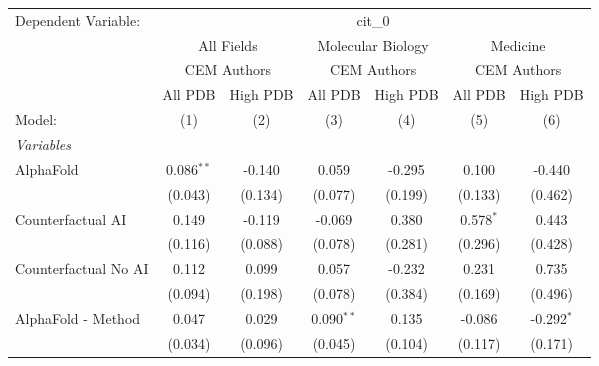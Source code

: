 \begingroup
\centering
\begin{tabular}{lcccccc}
   \tabularnewline \midrule \midrule
   Dependent Variable: & \multicolumn{6}{c}{cit\_0}\\
 & \multicolumn{2}{c}{All Fields} & \multicolumn{2}{c}{Molecular Biology} & \multicolumn{2}{c}{Medicine} \\
\cmidrule(lr){2-3} \cmidrule(lr){4-5} \cmidrule(lr){6-7}
 & \multicolumn{2}{c}{CEM Authors} & \multicolumn{2}{c}{CEM Authors} & \multicolumn{2}{c}{CEM Authors} \\
\cmidrule(lr){2-3} \cmidrule(lr){4-5} \cmidrule(lr){6-7}
 & \multicolumn{1}{c}{All PDB} & \multicolumn{1}{c}{High PDB} & \multicolumn{1}{c}{All PDB} & \multicolumn{1}{c}{High PDB} & \multicolumn{1}{c}{All PDB} & \multicolumn{1}{c}{High PDB} \\
\cmidrule(lr){2-2} \cmidrule(lr){3-3} \cmidrule(lr){4-4} \cmidrule(lr){5-5} \cmidrule(lr){6-6} \cmidrule(lr){7-7}
   Model:                                                     & (1)           & (2)            & (3)          & (4)     & (5)           & (6)\\  
   \midrule
   \emph{Variables}\\
   AlphaFold                                                  & 0.086$^{**}$  & -0.140         & 0.059        & -0.295  & 0.100         & -0.440\\   
                                                              & (0.043)       & (0.134)        & (0.077)      & (0.199) & (0.133)       & (0.462)\\   
   Counterfactual AI                                          & 0.149         & -0.119         & -0.069       & 0.380   & 0.578$^{*}$   & 0.443\\   
                                                              & (0.116)       & (0.088)        & (0.078)      & (0.281) & (0.296)       & (0.428)\\   
   Counterfactual No AI                                       & 0.112         & 0.099          & 0.057        & -0.232  & 0.231         & 0.735\\   
                                                              & (0.094)       & (0.198)        & (0.078)      & (0.384) & (0.169)       & (0.496)\\   
   AlphaFold - Method                                         & 0.047         & 0.029          & 0.090$^{**}$ & 0.135   & -0.086        & -0.292$^{*}$\\   
                                                              & (0.034)       & (0.096)        & (0.045)      & (0.104) & (0.117)       & (0.171)\\   

\end{tabular}

